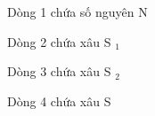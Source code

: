 Dòng 1 chứa số nguyên N  

   Dòng 2 chứa xâu S   $_    1   $

   Dòng 3 chứa xâu S   $_    2   $

   Dòng 4 chứa xâu S  

\